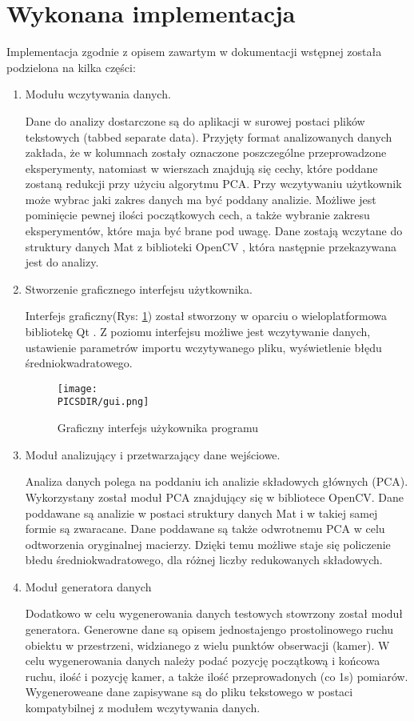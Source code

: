 \documentclass[a4paper,12pt]{article}
\def\PICSDIR{PICS}
\begin{document}
\section{Wykonana implementacja}

Implementacja zgodnie z opisem zawartym w dokumentacji wstępnej została podzielona na kilka części:

\begin{enumerate}
\item Modułu wczytywania danych.

Dane do analizy dostarczone są do aplikacji w surowej postaci plików tekstowych (tabbed separate data). Przyjęty format analizowanych danych zakłada, że w kolumnach zostały oznaczone poszczególne przeprowadzone eksperymenty, natomiast w wierszach znajdują się cechy, które poddane zostaną redukcji przy użyciu algorytmu PCA.  Przy wczytywaniu użytkownik może wybrac jaki zakres danych ma być poddany analizie. Możliwe jest pominięcie pewnej ilości początkowych cech, a także wybranie zakresu eksperymentów, które maja być brane pod uwagę. Dane zostają wczytane do struktury danych Mat z biblioteki OpenCV \cite{opencv}, która następnie przekazywana jest do analizy.
\item Stworzenie graficznego interfejsu użytkownika.

Interfejs graficzny(Rys: \ref{rys:gui}) został stworzony w oparciu o wieloplatformowa bibliotekę Qt \cite{qt}. Z poziomu interfejsu możliwe jest wczytywanie danych, ustawienie parametrów importu wczytywanego pliku, wyświetlenie błędu średniokwadratowego.

\begin{figure}
\centering
\texttt{[image: \\PICSDIR/gui.png]}
\caption{Graficzny interfejs użykownika programu}
\label{rys:gui}
\end{figure}


\item Moduł analizujący i przetwarzający dane wejściowe.

Analiza danych polega na poddaniu ich analizie składowych głównych (PCA). Wykorzystany został moduł PCA znajdujący się w bibliotece OpenCV. Dane poddawane są analizie w postaci struktury danych Mat i w takiej samej formie są zwaracane. Dane poddawane są także odwrotnemu PCA w celu odtworzenia oryginalnej macierzy. Dzięki temu możliwe staje się policzenie błedu średniokwadratowego, dla różnej liczby redukowanych składowych. 

\item Moduł generatora danych

Dodatkowo w celu wygenerowania danych testowych stowrzony został moduł generatora. Generowne dane są opisem  jednostajengo prostolinowego ruchu obiektu w przestrzeni, widzianego z wielu punktów obserwacji (kamer). W celu wygenerowania danych należy podać pozycję początkową i końcowa ruchu, ilość i pozycję kamer, a także ilość przeprowadonych (co 1s) pomiarów. Wygeneroweane dane zapisywane są do pliku tekstowego w postaci kompatybilnej z modułem wczytywania danych. 
\end{enumerate}
\end{document}
